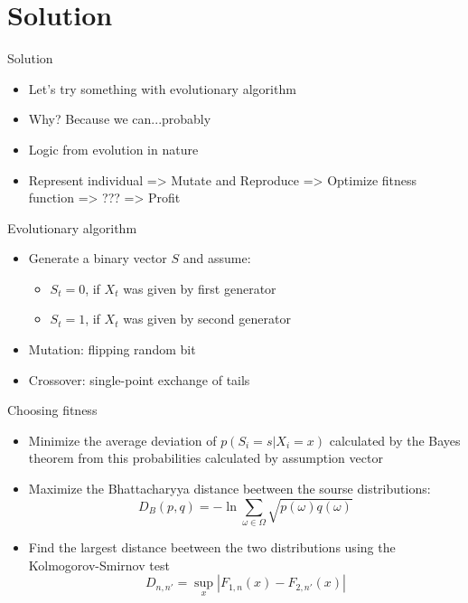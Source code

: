 \documentclass[hyperref=unicode,graphics=pdflatex,13pt]{beamer}
\begin{document}
\section{Solution} %
\begin{frame}{Solution}
  \begin{itemize}
   \item Let's try something with evolutionary algorithm
   \item Why? Because we can...probably
   \item Logic from evolution in nature
   \item Represent individual => Mutate and Reproduce => Optimize fitness function => ??? => Profit
  \end{itemize}

\end{frame}

\begin{frame}{Evolutionary algorithm}
 \begin{itemize}
  \item Generate a binary vector $S$ and assume:
   \begin{itemize}
   \item $S_t = 0$, if $X_t$ was given by first generator
   \item $S_t = 1$, if $X_t$ was given by second generator
   \end{itemize}
  \item Mutation: flipping random bit
  \item Crossover: single-point exchange of tails
 \end{itemize}
\end{frame}

\begin{frame}{Choosing fitness}
\begin{itemize}
   \item Minimize the average deviation of $p(S_i=s | X_i = x)$ calculated by the Bayes theorem from this probabilities calculated by assumption vector
   \item Maximize the Bhattacharyya distance beetween the sourse distributions:
   $$D_B(p, q) = -\ln{\sum_{\omega \in \Omega} \sqrt{p(\omega)q(\omega)}}$$
   \item Find the largest distance beetween the two distributions using the Kolmogorov-Smirnov test
   $$D_{n,n'} = \sup_{x} | F_{1,n}(x) - F_{2,n'}(x)|  $$ 
\end{itemize}




\end{frame}
\end{document}
